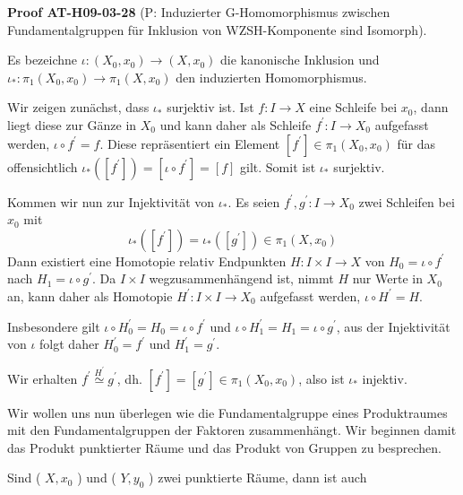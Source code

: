 \documentclass[10pt, letterpaper]{article}
\newcommand{\CustomHeading}[3]{%
  \par\medskip\noindent%
  \textbf{#1 #2} \textnormal{(#3)}.\enskip%
}
\newenvironment{PROOF}[2]{\begin{unitbox}\CustomHeading{Proof}{#1}{#2}}{\end{unitbox}}
\begin{document}
\begin{PROOF}{AT-H09-03-28}{P: Induzierter G-Homomorphismus zwischen Fundamentalgruppen für Inklusion von WZSH-Komponente sind Isomorph}
Es bezeichne $\iota:\left(X_{0}, x_{0}\right) \rightarrow\left(X, x_{0}\right)$ die kanonische Inklusion und $\iota_{*}: \pi_{1}\left(X_{0}, x_{0}\right) \rightarrow \pi_{1}\left(X, x_{0}\right)$ den induzierten Homomorphismus.

Wir zeigen zunächst, dass $\iota_{*}$ surjektiv ist. Ist $f: I \rightarrow X$ eine Schleife bei $x_{0}$, dann liegt diese zur Gänze in $X_{0}$ und kann daher als Schleife $f^{\prime}: I \rightarrow X_{0}$ aufgefasst werden, $\iota \circ f^{\prime}=f$. Diese repräsentiert ein Element $\left[f^{\prime}\right] \in \pi_{1}\left(X_{0}, x_{0}\right)$ für das offensichtlich $\iota_{*}\left(\left[f^{\prime}\right]\right)=\left[\iota \circ f^{\prime}\right]=[f]$ gilt. Somit ist $\iota_{*}$ surjektiv.

Kommen wir nun zur Injektivität von $\iota_{*}$. Es seien $f^{\prime}, g^{\prime}: I \rightarrow X_{0}$ zwei Schleifen bei $x_{0}$ mit 
$$\iota_{*}\left(\left[f^{\prime}\right]\right)=\iota_{*}\left(\left[g^{\prime}\right]\right) \in \pi_{1}\left(X, x_{0}\right)$$ 
Dann existiert eine Homotopie relativ Endpunkten $H: I \times I \rightarrow X$ von $H_{0}=\iota \circ f^{\prime}$ nach $H_{1}=\iota \circ g^{\prime}$. Da $I \times I$ wegzusammenhängend ist, nimmt $H$ nur Werte in $X_{0}$ an, kann daher als Homotopie $H^{\prime}: I \times I \rightarrow X_{0}$ aufgefasst werden, $\iota \circ H^{\prime}=H$. 

Insbesondere gilt $\iota \circ H_{0}^{\prime}=H_{0}=\iota \circ f^{\prime}$ und $\iota \circ H_{1}^{\prime}=H_{1}=\iota \circ g^{\prime}$, aus der Injektivität von $\iota$ folgt daher $H_{0}^{\prime}=f^{\prime}$ und $H_{1}^{\prime}=g^{\prime}$. 

Wir erhalten $f^{\prime} \stackrel{H^{\prime}}{\simeq} g^{\prime}$, dh. $\left[f^{\prime}\right]=\left[g^{\prime}\right] \in \pi_{1}\left(X_{0}, x_{0}\right)$, also ist $\iota_{*}$ injektiv.
\end{PROOF}



Wir wollen uns nun überlegen wie die Fundamentalgruppe eines Produktraumes mit den Fundamentalgruppen der Faktoren zusammenhängt. Wir beginnen damit das Produkt punktierter Räume und das Produkt von Gruppen zu besprechen.

Sind ( $X, x_{0}$ ) und ( $Y, y_{0}$ ) zwei punktierte Räume, dann ist auch
\end{document}
